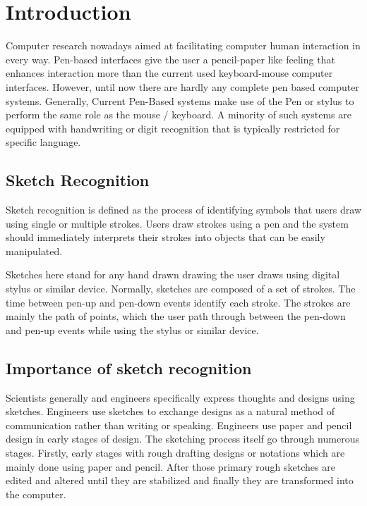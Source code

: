 \chapter {Introduction}

Computer research nowadays aimed at facilitating computer human interaction in every way. Pen-based interfaces give the user a pencil-paper like feeling that enhances interaction more than the current used keyboard-mouse computer interfaces. However, until now there are hardly any complete pen based computer systems. Generally, Current Pen-Based systems make use of the Pen or stylus to perform the same role as the mouse / keyboard. A minority of such systems are equipped with handwriting or digit recognition that is typically restricted for specific language. 

\section{Sketch Recognition}
Sketch recognition is defined as the process of identifying symbols that users draw using single or multiple strokes. Users draw strokes using a pen and the system should immediately interprets their strokes into objects that can be easily manipulated.

Sketches here stand for any hand drawn drawing the user draws using digital stylus or similar device. Normally, sketches are composed of a set of strokes. The time between pen-up and pen-down events identify each stroke. The strokes are mainly the path of points, which the user path through between the pen-down and pen-up events while using the stylus or similar device. 
  
\section{Importance of sketch recognition}
\label{sec:ImportanceOfSketchRecognition}


Scientists generally and engineers specifically express thoughts and designs using sketches. Engineers use sketches to exchange designs as a natural method of communication rather than writing or speaking. Engineers use paper and pencil design in early stages of design. The sketching process itself go through  numerous stages. Firstly, early stages with rough drafting designs or notations which are mainly done using paper and pencil. After those primary rough sketches are edited and altered until they are stabilized and finally they are transformed into the computer. 

